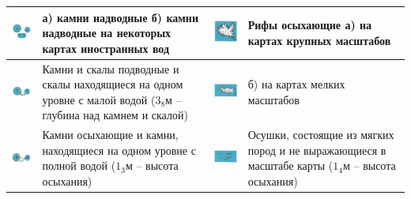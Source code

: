 \documentclass[a4paper, 12pt, twoside, final, book, russian, fittopage, cyremdash]{ncc}
\begin{document}
\small
\begin{longtable}{M|m{0.2\textwidth}|M|m{0.2\textwidth}}
  \toprule
  \includegraphics[scale=1.3]{APP-2-A-1} & а) камни надводные \newline б) камни надводные на некоторых картах иностранных вод &
  \includegraphics[scale=1.3]{APP-2-A-9} & Рифы осыхающие \newline а) на картах крупных масштабов \\
  \midrule
  \includegraphics[scale=1.3]{APP-2-A-2} & Камни и скалы подводные и скалы находящиеся на одном уровне с малой водой ($3_8$м \--- глубина над камнем и скалой) &
  \includegraphics[scale=1.3]{APP-2-A-10} & б) на картах мелких масштабов \\
  \midrule
  \includegraphics[scale=1.3]{APP-2-A-3} & Камни осыхающие и камни, находящиеся на одном уровне с полной водой ($1_3$м \--- высота осыхания) &
  \includegraphics[scale=1.3]{APP-2-A-11} & Осушки, состоящие из мягких пород и не выражающиеся в масштабе карты ($1_4$м \--- высота осыхания)\\

\end{longtable}
\end{document}
